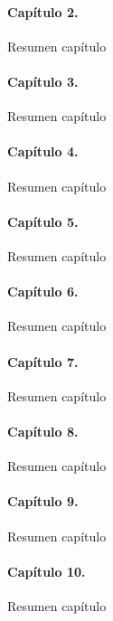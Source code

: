 \paragraph*{Capítulo 2.}
Resumen capítulo

\paragraph*{Capítulo 3.}
Resumen capítulo

\paragraph*{Capítulo 4.}
Resumen capítulo

\paragraph*{Capítulo 5.}
Resumen capítulo

\paragraph*{Capítulo 6.}
Resumen capítulo

\paragraph*{Capítulo 7.}
Resumen capítulo

\paragraph*{Capítulo 8.}
Resumen capítulo

\paragraph*{Capítulo 9.}
Resumen capítulo

\paragraph*{Capítulo 10.}
Resumen capítulo